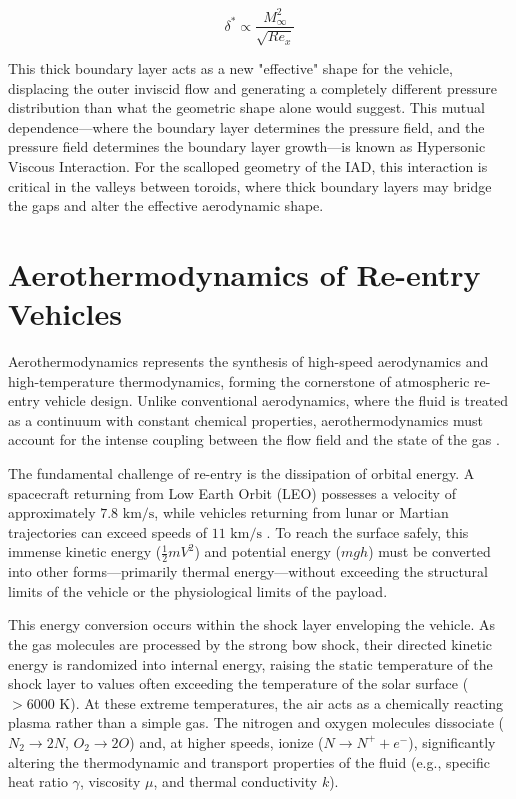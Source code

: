 \begin{equation}
    \delta^* \propto \frac{M_{\infty}^2}{\sqrt{Re_x}}
\end{equation}

This thick boundary layer acts as a new "effective" shape for the vehicle, displacing the outer inviscid flow and generating a completely different pressure distribution than what the geometric shape alone would suggest. This mutual dependence—where the boundary layer determines the pressure field, and the pressure field determines the boundary layer growth—is known as Hypersonic Viscous Interaction. For the scalloped geometry of the IAD, this interaction is critical in the valleys between toroids, where thick boundary layers may bridge the gaps and alter the effective aerodynamic shape.


\section{Aerothermodynamics of Re-entry Vehicles}
Aerothermodynamics represents the synthesis of high-speed aerodynamics and high-temperature thermodynamics, forming the cornerstone of atmospheric re-entry vehicle design. Unlike conventional aerodynamics, where the fluid is treated as a continuum with constant chemical properties, aerothermodynamics must account for the intense coupling between the flow field and the state of the gas \cite{AndersonHypersonic}.
\par
The fundamental challenge of re-entry is the dissipation of orbital energy. A spacecraft returning from Low Earth Orbit (LEO) possesses a velocity of approximately $7.8 \text{ km/s}$, while vehicles returning from lunar or Martian trajectories can exceed speeds of $11 \text{ km/s}$ \cite{AndersonHypersonic}. To reach the surface safely, this immense kinetic energy ($\frac{1}{2}mV^2$) and potential energy ($mgh$) must be converted into other forms—primarily thermal energy—without exceeding the structural limits of the vehicle or the physiological limits of the payload.
\par
This energy conversion occurs within the shock layer enveloping the vehicle. As the gas molecules are processed by the strong bow shock, their directed kinetic energy is randomized into internal energy, raising the static temperature of the shock layer to values often exceeding the temperature of the solar surface ($> 6000 \text{ K}$). At these extreme temperatures, the air acts as a chemically reacting plasma rather than a simple gas. The nitrogen and oxygen molecules dissociate ($N_2 \rightarrow 2N$, $O_2 \rightarrow 2O$) and, at higher speeds, ionize ($N \rightarrow N^+ + e^-$), significantly altering the thermodynamic and transport properties of the fluid (e.g., specific heat ratio $\gamma$, viscosity $\mu$, and thermal conductivity $k$).
